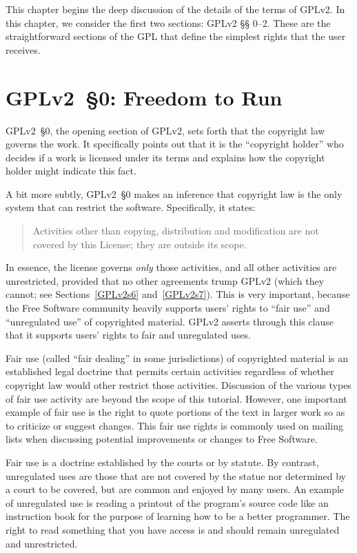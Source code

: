 This chapter begins the deep discussion of the details of the terms of
GPLv2\@. In this chapter, we consider the first two sections: GPLv2 \S\S
0--2. These are the straightforward sections of the GPL that define the
simplest rights that the user receives.

\section{GPLv2~\S0: Freedom to Run}
\label{GPLv2s0}

GPLv2~\S0, the opening section of GPLv2, sets forth that the copyright law governs
the work.  It specifically points out that it is the ``copyright
holder'' who decides if a work is licensed under its terms and explains
how the copyright holder might indicate this fact.

A bit more subtly, GPLv2~\S0 makes an inference that copyright law is the only
system that can restrict the software.  Specifically, it states:
\begin{quote}
Activities other than copying, distribution and modification are not
covered by this License; they are outside its scope.
\end{quote}
In essence, the license governs \emph{only} those activities, and all other
activities are unrestricted, provided that no other agreements trump GPLv2
(which they cannot; see Sections~\ref{GPLv2s6} and~\ref{GPLv2s7}).  This is
very important, because the Free Software community heavily supports
users' rights to ``fair use'' and ``unregulated use'' of copyrighted
material.  GPLv2 asserts through this clause that it supports users' rights
to fair and unregulated uses.

Fair use (called ``fair dealing'' in some jurisdictions) of copyrighted
material is an established legal doctrine that permits certain activities
regardless of whether copyright law would other restrict those activities.
Discussion of the various types of fair use activity are beyond the scope of
this tutorial.  However, one important example of fair use is the right to
quote portions of the text in larger work so as to criticize or suggest
changes.  This fair use rights is commonly used on mailing lists when
discussing potential improvements or changes to Free Software.

Fair use is a doctrine established by the courts or by statute.  By
contrast, unregulated uses are those that are not covered by the statue
nor determined by a court to be covered, but are common and enjoyed by
many users.  An example of unregulated use is reading a printout of the
program's source code like an instruction book for the purpose of learning
how to be a better programmer.  The right to read something that you have
access is and should remain unregulated and unrestricted.

